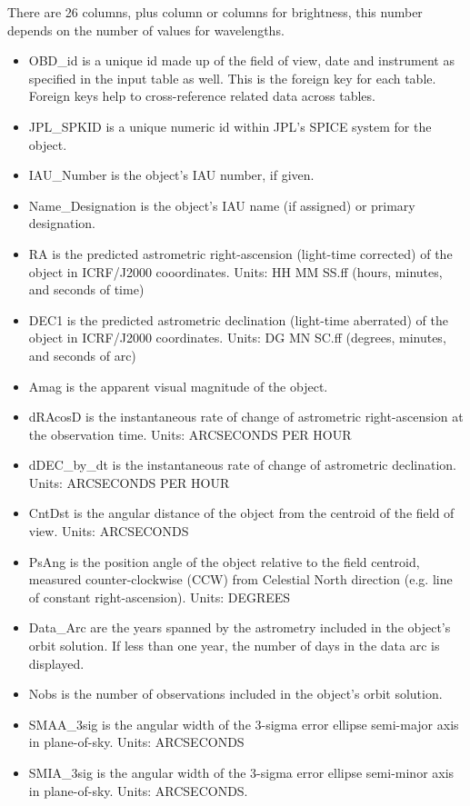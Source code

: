 There are 26 columns, plus column or columns for brightness, this number depends on the number of values for wavelengths.
\begin{itemize}
    \item OBD\_id is a unique id made up of the field of view, date and instrument as specified in the input table as well. This is the foreign key for each table. Foreign keys help to cross-reference related data across tables.
    \item JPL\_SPKID is a unique numeric id within JPL's SPICE system for the object.
    \item IAU\_Number is the object's IAU number, if given.
    \item Name\_Designation is the object's IAU name (if assigned) or primary designation. 
    \item RA is the predicted astrometric right-ascension (light-time corrected) of the object in ICRF/J2000 cooordinates. Units: HH MM SS.ff (hours, minutes, and seconds of time)
    \item DEC1 is the predicted astrometric declination (light-time aberrated) of the object 
in ICRF/J2000 coordinates. Units: DG MN SC.ff (degrees, minutes, and seconds 
of arc)
    \item Amag is the apparent visual magnitude of the object.
    \item dRAcosD is the instantaneous rate of change of astrometric right-ascension at the
observation time. Units: ARCSECONDS PER HOUR
    \item dDEC\_by\_dt is the instantaneous rate of change of astrometric declination. 
Units: ARCSECONDS PER HOUR
    \item CntDst is the angular distance of the object from the centroid of the field of view.
Units: ARCSECONDS
    \item PsAng is the position angle of the object relative to the field centroid, measured
counter-clockwise (CCW) from Celestial North direction (e.g. line of constant 
right-ascension). Units: DEGREES
    \item Data\_Arc are the years spanned by the astrometry included in the object's orbit solution.
If less than one year, the number of days in the data arc is displayed.
    \item Nobs is the number of observations included in the object's orbit solution.
    \item SMAA\_3sig is the angular width of the 3-sigma error ellipse semi-major axis in plane-of-sky. Units: ARCSECONDS
    \item SMIA\_3sig is the angular width of the 3-sigma error ellipse semi-minor axis in plane-of-sky. Units: ARCSECONDS.\textbf{}

\end{itemize}
